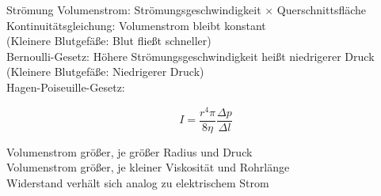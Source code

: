 \documentclass{beamer}
\begin{document}
\begin{frame}{Strömung}
    Volumenstrom: Strömungsgeschwindigkeit \(\times\) Querschnittsfläche \\[0.2 cm]
    \pause
    Kontinuitätsgleichung: Volumenstrom bleibt konstant  \\
    (Kleinere Blutgefäße: Blut fließt schneller) \\[0.2 cm]
    \pause
    Bernoulli-Gesetz:  Höhere Strömungsgeschwindigkeit heißt niedrigerer Druck  \\
    (Kleinere Blutgefäße: Niedrigerer Druck) \\[0.2 cm]
    \pause
    Hagen-Poiseuille-Gesetz: 
 
    \[I=\frac{r^4\pi}{8\eta}\frac{\Delta p}{\Delta l}\]
 
    Volumenstrom größer, je größer Radius und Druck \\
    Volumenstrom größer, je kleiner Viskosität und Rohrlänge \\[0.2 cm]
    \pause
    Widerstand verhält sich analog zu elektrischem Strom
\end{frame}

\end{document}
